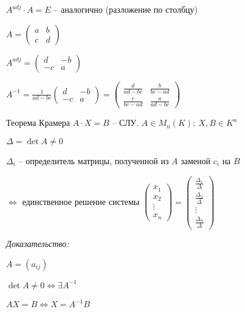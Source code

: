 \documentclass[12pt]{article}
\begin{document}
$A^{adj} \cdot A = E$ -- аналогично (разложение по столбцу)

\begin{Example}{}
    $A = \begin{pmatrix}
        a & b \\
        c & d 
    \end{pmatrix}$

    $A^{adj} = \begin{pmatrix}
        d & -b \\
        -c & a
    \end{pmatrix}$

    $A^{-1} = \frac{1}{ad - bc} \begin{pmatrix}
        d & -b \\
        -c & a
    \end{pmatrix} = \begin{pmatrix}
        \frac{d}{ad - bc} & \frac{b}{bc - ad} \\
        \frac{c}{bc - ad} & \frac{a}{ad - bc}
    \end{pmatrix}$
\end{Example}

\begin{theo}{Теорема Крамера}
    $A \cdot X = B$ -- СЛУ. $A \in M_n(K);\ X, B \in K^n$

    $\Delta = \det A \neq 0$

    $\Delta_i$ -- определитель матрицы, полученной из $A$ заменой $c_i$ на $B$

    $\Leftrightarrow$ единственное решение системы $\begin{pmatrix}
        x_1 \\
        x_2 \\
        \vdots \\
        x_n
    \end{pmatrix} = \begin{pmatrix}
        \frac{\Delta_1}{\Delta} \\
        \frac{\Delta_2}{\Delta} \\
        \vdots \\
        \frac{\Delta_n}{\Delta}
    \end{pmatrix}$
\end{theo}

\textit{Доказательство:}

$A = (a_{ij})$

$\det A \neq 0 \Leftrightarrow \exists A^{-1}$

$AX = B \Leftrightarrow X = A^{-1}B$
\end{document}
